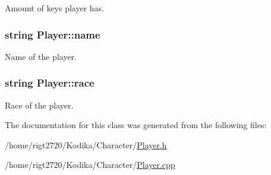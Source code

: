 Amount of keys player has. 

\hypertarget{classPlayer_acf0355128a99ee20ad9931b760fb2de1}{
\subsubsection[{name}]{\setlength{\rightskip}{0pt plus 5cm}string Player\-::name\hspace{0.3cm}{\ttfamily [private]}}}\label{classPlayer_acf0355128a99ee20ad9931b760fb2de1}


Name of the player. 

\hypertarget{classPlayer_a5130cb6c4233cd7ad1212af0d1790e58}{
\subsubsection[{race}]{\setlength{\rightskip}{0pt plus 5cm}string Player\-::race\hspace{0.3cm}{\ttfamily [private]}}}\label{classPlayer_a5130cb6c4233cd7ad1212af0d1790e58}


Race of the player. 



The documentation for this class was generated from the following files\-:\begin{DoxyCompactItemize}
\item 
/home/rigt2720/\-Kodika/\-Character/\hyperlink{Player_8h}{Player.\-h}\item 
/home/rigt2720/\-Kodika/\-Character/\hyperlink{Player_8cpp}{Player.\-cpp}\end{DoxyCompactItemize}
